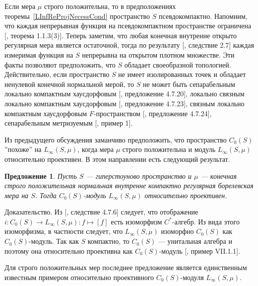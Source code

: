 \documentclass[12pt]{article}
\numberwithin{equation}{subsection}
\theoremstyle{plain}
\newtheorem{proposition}{Предложение}
\newenvironment{proof}{Доказательство.}{}
\begin{document}
\begin{fulltext}
    Если мера $\mu$ строго положительна, то в предположениях
    теоремы~\ref{LInfReProjNecessCond} пространство $S$ псевдокомпактно.
    Напомним, что каждая непрерывная функция на псевдокомпактном пространстве
    ограничена [\cite{HrusPseudCompTopSp}, теорема 1.1.3(3)]. Теперь заметим,
    что любая конечная внутренне открыто регулярная мера является остаточной,
    тогда по результату [\cite{ZindResMeasLocCompSp}, следствие 2.7] каждая
    измеримая функция на $S$ непрерывна на открытом плотном множестве. Эти факты
    позволяют предположить, что $S$ обладает своеобразной топологией.
    Действительно, если пространство $S$ не имеет изолированных точек и обладает
    ненулевой конечной нормальной мерой, то $S$ не может быть сепарабельным
    локально компактным хаусдорфовым [\cite{DalesBanSpContFunDualSp},
    предложение 4.7.20], локально связным локально компактным хаусдорфовым
    [\cite{DalesBanSpContFunDualSp}, предложение 4.7.23], связным локально
    компактным хаусдорфовым $F$-пространством [\cite{DalesBanSpContFunDualSp},
    предложение 4.7.24], сепарабельным метризуемым [\cite{FlachNormMeasTopSp},
    пример 1].


    Из предыдущего обсуждения заманчиво предположить, что пространство $C_0(S)$
    ''похоже'' на  $L_\infty(S,\mu)$, когда мера $\mu$ строго положительна и
    модуль $L_\infty(S,\mu)$ относительно проективен. В этом направлении есть
    следующий результат.

    \begin{proposition}\label{LInfReProjSuffCond} Пусть $S$ --- гиперстоуново
        пространство и $\mu$ --- конечная строго положительная нормальная
        внутренне компактно регулярная борелевская мера на $S$. Тогда
        $C_0(S)$-модуль $L_\infty(S,\mu)$ относительно проективен.
    \end{proposition}
    \begin{proof} Из [\cite{DalesBanSpContFunDualSp}, следствие 4.7.6] следует,
        что отображение $i:C_0(S)\to L_\infty(S,\mu): f\mapsto [f]$ есть
        изоморфизм $C^*$-алгебр. Из вида этого изоморфизма, в частности следует,
        что $L_\infty(S,\mu)$ изоморфно $C_0(S)$ как $C_0(S)$-модуль. Так как
        $S$ компактно, то $C_0(S)$ --- унитальная алгебра и поэтому она
        относительно проективна как $C_0(S)$-модуль [\cite{HelBanLocConvAlg},
        пример VII.1.1].
    \end{proof}

    Для строго положительных мер последнее предложение является единственным
    известным примером относительно проективного $C_0(S)$-модуля
    $L_\infty(S,\mu)$.

\end{fulltext}
\end{document}
